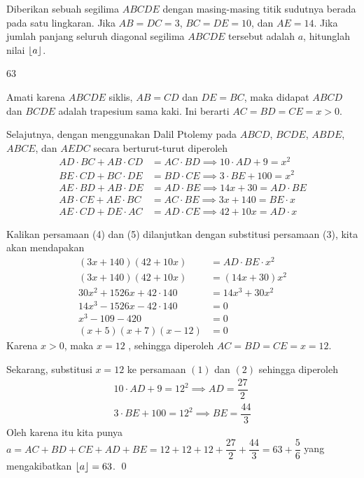 \documentclass[11pt]{scrartcl}
\begin{document}
	\begin{soalbaru}
		Diberikan sebuah segilima $ABCDE$ dengan masing-masing titik sudutnya berada pada satu lingkaran. Jika $AB=DC=3$, $BC=DE=10$, dan $AE=14$. Jika jumlah panjang seluruh diagonal segilima $ABCDE$ tersebut adalah $a$, hitunglah nilai $\left\lfloor a \right\rfloor$.
		\begin{jawaban}
		63
		\end{jawaban}
		\begin{solusi}
		Amati karena $ABCDE$ siklis, $AB=CD$ dan $DE=BC$, maka didapat $ABCD$ dan $BCDE$ adalah trapesium sama kaki. Ini berarti $AC=BD=CE=x > 0$.
		
		Selajutnya, dengan menggunakan Dalil Ptolemy pada $ABCD$, $BCDE$, $ABDE$, $ABCE$, dan $AEDC$ secara berturut-turut diperoleh 
		\begin{align}
		AD \cdot BC + AB \cdot CD &= AC \cdot BD \implies 10\cdot AD+9 = x^2\\
		BE \cdot CD + BC \cdot DE &= BD \cdot CE \implies 3 \cdot BE + 100 = x^2\\
		AE \cdot BD + AB \cdot DE &= AD \cdot BE \implies 14x+30 = AD \cdot BE\\
		AB \cdot CE + AE \cdot BC &= AC \cdot BE \implies 3x+140 = BE \cdot x\\
		AE \cdot CD + DE \cdot AC &= AD \cdot CE \implies 42+10x=AD \cdot x
		\end{align}
		
		Kalikan persamaan (4) dan (5) dilanjutkan dengan substitusi persamaan (3), kita akan mendapakan 
		\begin{align*}
		(3x+140)(42+10x) &= AD \cdot BE \cdot x^2\\
		(3x+140)(42+10x) &= (14x+30)x^2\\
		30x^2+1526x+42\cdot140 &= 14x^3+30x^2\\
		14x^3-1526x-42\cdot 140 &= 0\\
		x^3-109-420 &= 0\\
		(x+5)(x+7)(x-12) &= 0
		\end{align*}
		 Karena $x>0$, maka $x=12$ , sehingga diperoleh $AC = BD = CE = x =12$.
		 
		 Sekarang, substitusi $x=12$ ke persamaan $(1)$ dan $(2)$ sehingga diperoleh 
		 \begin{align*}
		 10\cdot AD + 9 = 12^2 \implies AD = \dfrac{27}{2}\\
		 3\cdot BE + 100 = 12^2 \implies BE = \dfrac{44}{3}
		 \end{align*}
		 Oleh karena itu kita punya $a = AC +BD +CE +AD +BE = 12+12+12+\dfrac{27}{2}+\dfrac{44}{3}=63+\dfrac{5}{6}$ yang mengakibatkan $\left\lfloor a \right\rfloor=63$. \qed
		
		\end{solusi}
	\end{soalbaru}
	
\end{document}
